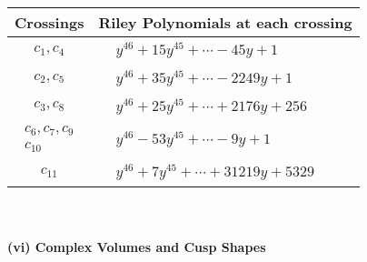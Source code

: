\documentclass[1p]{elsarticle_modified}
\theoremstyle{definition}
\begin{document}
\begin{tabular}{m{50pt}|m{274pt}}
Crossings & \hspace{64pt}Riley Polynomials at each crossing \\
\hline $$\begin{aligned}c_{1},c_{4}\end{aligned}$$&$\begin{aligned}
&y^{46}+15 y^{45}+\cdots-45 y+1
\end{aligned}$\\
\hline $$\begin{aligned}c_{2},c_{5}\end{aligned}$$&$\begin{aligned}
&y^{46}+35 y^{45}+\cdots-2249 y+1
\end{aligned}$\\
\hline $$\begin{aligned}c_{3},c_{8}\end{aligned}$$&$\begin{aligned}
&y^{46}+25 y^{45}+\cdots+2176 y+256
\end{aligned}$\\
\hline $$\begin{aligned}c_{6},c_{7},c_{9}\\c_{10}\end{aligned}$$&$\begin{aligned}
&y^{46}-53 y^{45}+\cdots-9 y+1
\end{aligned}$\\
\hline $$\begin{aligned}c_{11}\end{aligned}$$&$\begin{aligned}
&y^{46}+7 y^{45}+\cdots+31219 y+5329
\end{aligned}$\\
\hline
\end{tabular}\\~\\
\newpage\flushleft \textbf{(vi) Complex Volumes and Cusp Shapes}
\end{document}
